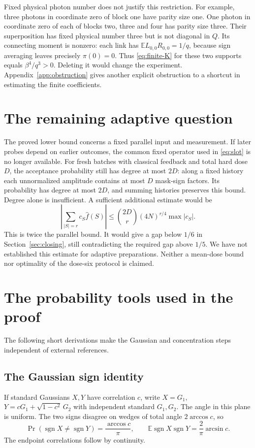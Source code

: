 \documentclass[11pt]{article}
\newcommand{\E}{\mathbb E}
\newcommand{\sgn}{\operatorname{sgn}}
\newcommand{\wh}{\widehat}
\newcommand{\1}{\mathbf 1}
\begin{document}
Fixed physical photon number does not justify this restriction.
For example, three photons in coordinate zero of block one have parity
size one. One photon in coordinate zero of each of blocks two, three
and four has parity size three. Their superposition has fixed physical
number three but is not diagonal in $Q$. Its connecting moment is
nonzero: each link has $\E L_{0,0}R_{0,0}=1/q$, because sign averaging
leaves precisely $\pi(0)=0$. Thus \eqref{eq:finite-K} for these two
supports equals $\beta^4/q^3>0$. Deleting it would change the experiment.
Appendix~\ref{app:obstruction} gives another explicit obstruction to
a shortcut in estimating the finite coefficients.

\section{The remaining adaptive question}
The proved lower bound concerns a fixed parallel input and measurement.
If later probes depend on earlier outcomes, the common fixed operator
used in \eqref{eq:slot} is no longer available. For fresh batches with
classical feedback and total hard dose $D$, the acceptance probability
still has degree at most $2D$: along a fixed history each unnormalized
amplitude contains at most $D$ mask-sign factors. Its probability has
degree at most $2D$, and summing histories preserves this bound.
Degree alone is insufficient.
A sufficient additional estimate would be
\[
 \left|\sum_{|S|=r}c_S\wh f(S)\right|
 \le \binom{2D}{r}(4N)^{r/4}\max|c_S|.
\]
This is twice the parallel bound. It would give a gap below $1/6$ in
Section~\ref{sec:closing}, still contradicting the required gap above
$1/5$. We have not established this estimate for adaptive preparations.
Neither a mean-dose bound nor optimality of the dose-six protocol is
claimed.

\appendix
\section{The probability tools used in the proof}\label{app:tools}
The following short derivations make the Gaussian and concentration
steps independent of external references.

\subsection{The Gaussian sign identity}
If standard Gaussians $X,Y$ have correlation $c$, write
$X=G_1$, $Y=cG_1+\sqrt{1-c^2}\,G_2$ with independent standard
$G_1,G_2$. The angle in this plane is uniform. The two signs disagree
on wedges of total angle $2\arccos c$, so
\[
 \Pr(\sgn X\ne\sgn Y)=\frac{\arccos c}{\pi},\qquad
 \E\sgn X\sgn Y=\frac2\pi\arcsin c.
\]
The endpoint correlations follow by continuity.
\end{document}
